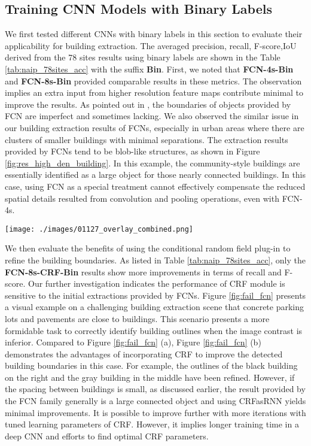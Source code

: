 \documentclass[journal]{IEEEtran}
\begin{document}
\subsection{Training CNN Models with Binary Labels}
We first tested different CNNs with binary labels in this section to evaluate their applicability for building extraction. The averaged precision, recall, F-score,IoU derived from the 78 sites results using binary labels are shown in the Table \ref{tab:naip_78sites_acc} with the suffix \textbf{Bin}. First, we noted that \textbf{FCN-4s-Bin} and \textbf{FCN-8s-Bin} provided comparable results in these metrics. The observation implies an extra input from higher resolution feature maps contribute minimal to improve the results. As pointed out in \cite{ZhengJayasumanaRomera-ParedesEtAl2015, BadrinarayananKendallCipolla2017}, the boundaries of objects provided by FCN are imperfect and sometimes lacking. We also observed the similar issue in our building extraction results of FCNs, especially in urban areas where there are clusters of smaller buildings with minimal separations. The extraction results provided by FCNs tend to be blob-like structures, as shown in Figure \ref{fig:res_high_den_building}. In this example, the community-style buildings are essentially identified as a large object for those nearly connected buildings. In this case, using FCN as a special treatment cannot effectively compensate the reduced spatial details resulted from convolution and pooling operations, even with FCN-4s. 

\begin{figure*}[t!]
	\texttt{[image: ./images/01127\_overlay\_combined.png]}
	\caption{Example: High density building area where red lines delineate the  building extraction results and blue lines denote the ground truth.}
	\label{fig:res_high_den_building}
\end{figure*}

We then evaluate the benefits of using the conditional random field plug-in to refine the building boundaries. As listed in Table \ref{tab:naip_78sites_acc}, only the \textbf{FCN-8s-CRF-Bin} results show more improvements in terms of recall and F-score. Our further investigation indicates the performance of CRF module is sensitive to the initial extractions provided by FCNs. Figure \ref{fig:fail_fcn} presents a visual example on a challenging building extraction scene that concrete parking lots and pavements are close to buildings. This scenario presents a more formidable task to correctly identify building outlines when the image contrast is inferior. Compared to Figure \ref{fig:fail_fcn} (a), Figure \ref{fig:fail_fcn} (b) demonstrates the advantages of incorporating CRF to improve the detected building boundaries in this case. For example, the outlines of the black building on the right and the gray building in the middle have been refined. However, if the spacing between buildings is small, as discussed earlier, the result provided by the FCN family generally is a large connected object and using CRFasRNN yields minimal improvements. It is possible to improve further with more iterations with tuned learning parameters of CRF. However, it implies longer training time in a deep CNN and efforts to find optimal CRF parameters.
\end{document}
